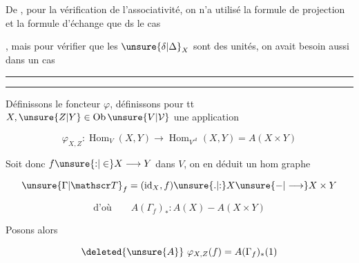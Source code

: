 De , pour la  vérification de l'associativité, on n'a utilisé la formule de projection et la formule d'échange que ds le cas


, mais pour vérifier que les $\unsure{\delta|\Delta}_X$ sont des unités, on  avait besoin aussi dans un cas


\noindent\rule{2.7cm}{0.3pt}\par\nobreak\vspace{-0.8\baselineskip}\noindent\rule{3cm}{0.3pt}

Définissons le foncteur $\varphi$,  définissons pour tt $X,\unsure{Z|Y}\in\mathrm{Ob}\,\unsure{V|\mathcal V}$ une application

\[
\varphi_{X,Z}:\operatorname{Hom}_{V}(X,Y)\longrightarrow\operatorname{Hom}_{V^{\mathcal A}}(X,Y)=A(X\times Y)
\]

Soit donc $f\unsure{{:}|\in}X\longrightarrow Y$ dans $V$, on en déduit un hom graphe

\[
\unsure{\Gamma|\mathscr T}_f=(\mathrm{id}_X,f)\unsure{. |{:}}X\unsure{\mathbin{-}|\longrightarrow}X\times Y
\]

\[
\text{d'où}\qquad A(\Gamma_f)_*:A(X)\mathbin{-}A(X\times Y)
\]

Posons alors

\[
\deleted{\unsure{A}}\ \varphi_{X,Z}(f)=A(\Gamma_f)_*(1)
\]


